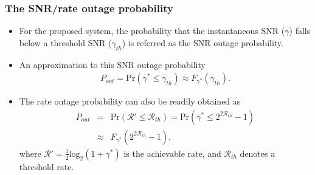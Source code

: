 \documentclass[article,mathserif,10pt,envcountsect]{beamer}
\renewcommand{\log}[2][]{\mathrm{log}_{#1}\left(#2\right)}
\begin{document}
\begin{frame}
\frametitle{The SNR/rate outage probability}
\begin{itemize}
	\item For the proposed system, the probability that the instantaneous SNR ($\gamma$) falls below a threshold SNR ($\gamma_{th}$) is referred as  the SNR outage probability.

	\item An approximation to this SNR outage probability 
	\begin{eqnarray}\label{eqn:out_prob}
	P_{out} = \mathrm{Pr}\left(\gamma^* \leq \gamma_{th}\right) \approx F_{\gamma^*}(\gamma_{th}). \nonumber
	\end{eqnarray}  
	
	\item The rate outage probability can also be readily obtained as
	\begin{eqnarray}
	P_{out} &=& \mathrm{Pr}\left(\mathcal{R}' \leq \mathcal{R}_{th}\right) = \mathrm{Pr}\left(\gamma^* \leq 2^{2\mathcal{R}_{th}}-1\right) \nonumber \\
	&\approx& F_{\gamma^*}(2^{2\mathcal{R}_{th}}-1),\nonumber
	\end{eqnarray}
	where $\mathcal{R}'=\frac{1}{2}\log[2]{1+\gamma^*}$ is the achievable rate, and $\mathcal{R}_{th}$ denotes a threshold rate. 
	
\end{itemize}

\end{frame}
\end{document}
